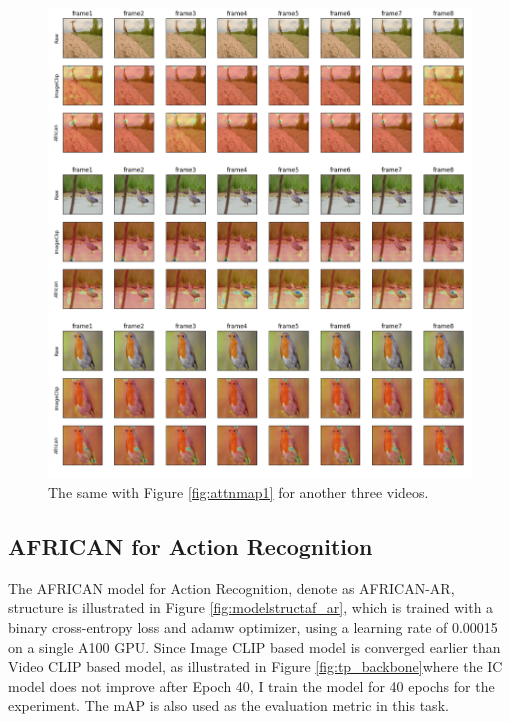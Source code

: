 \begin{figure}[ht]
    \centering
    \includegraphics[width=1.0\textwidth]{assets/imgs/5_4_AttentionMaps_2}
    \caption[Attention Map 1]{The same with Figure \ref{fig:attnmap1} for another three videos.}
    \label{fig:attnmap2}
\end{figure}







\subsection{AFRICAN for Action Recognition}
The AFRICAN model for Action Recognition, denote as AFRICAN-AR, structure is illustrated in Figure \ref{fig:modelstructaf_ar}, which is trained with a binary cross-entropy loss and adamw optimizer, using a learning rate of 0.00015 on a single A100 GPU. Since Image CLIP based model is converged earlier than Video CLIP based model, as illustrated in Figure \ref{fig:tp_backbone}where the IC model does not improve after Epoch 40, I train the model for 40 epochs for the experiment. The mAP is also used as the evaluation metric in this task.

